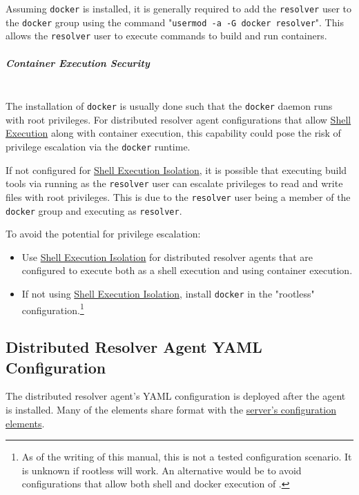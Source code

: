 Assuming \texttt{docker} is installed, it is generally required to add the \texttt{resolver} user to the \texttt{docker}
group using the command "\texttt{usermod -a -G docker resolver}".  This allows the \texttt{resolver} user to execute
commands to build and run containers.

\subparagraph{Container Execution Security}
\noindent\\The installation of \texttt{docker} is usually done such that the \texttt{docker} daemon runs with
root privileges.  For distributed resolver agent configurations that allow 
\hyperref[par:agent-shell-execution]{Shell Execution} along with container execution, this capability could pose
the risk of privilege escalation via the \texttt{docker} runtime.

If not configured for \hyperref[par:shell-agent-isolation]{Shell Execution Isolation}, it is possible that
executing build tools via \scaresolver running as the \texttt{resolver} user can escalate privileges
to read and write files with root privileges.  This is due to the \texttt{resolver} user being a member of
the \texttt{docker} group and \scaresolver executing as \texttt{resolver}.  

To avoid the potential for privilege escalation:

\begin{itemize}
  \item Use \hyperref[par:shell-agent-isolation]{Shell Execution Isolation} for distributed resolver agents that are configured
    to execute \scaresolver both as a shell execution and using container execution.
  \item If not using \hyperref[par:shell-agent-isolation]{Shell Execution Isolation}, install \texttt{docker} in the "rootless"
    configuration.\footnote{As of the writing of this manual, this is not a tested configuration scenario.  It is unknown if rootless will work.
    An alternative would be to avoid configurations that allow both shell and docker execution of \scaresolverns.}
\end{itemize}



\subsection{Distributed Resolver Agent YAML Configuration}

The distributed resolver agent's YAML configuration is deployed after the agent is installed.
Many of the elements share format with the \hyperref[sec:yaml-config]{server's configuration elements}. 


